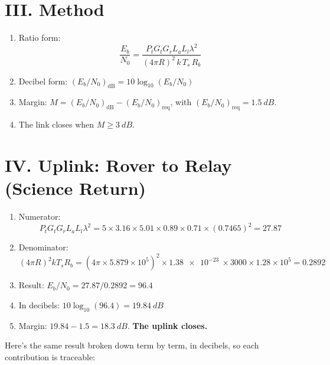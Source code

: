 \documentclass[11pt]{article}
\begin{document}
\section*{III. Method}

\begin{enumerate}[label=\alph*., leftmargin=*]
    \item Ratio form:
    \[
        \frac{E_b}{N_0} = \frac{P_t G_t G_r L_a L_l \lambda^2}{(4\pi R)^2\, k\, T_s\, R_b}
    \]
    \item Decibel form: $\left(E_b/N_0\right)_{\mathrm{dB}} = 10\log_{10}\left(E_b/N_0\right)$
    \item Margin: $M = \left(E_b/N_0\right)_{\mathrm{dB}} - \left(E_b/N_0\right)_{\mathrm{req}}$,
    with $\left(E_b/N_0\right)_{\mathrm{req}} = \SI{1.5}{dB}$.
    \item The link closes when $M \geq \SI{3}{dB}$.
\end{enumerate}

\section*{IV. Uplink: Rover to Relay (Science Return)}

\begin{enumerate}[label=\alph*., leftmargin=*]
    \item Numerator:
    \[
        P_t G_t G_r L_a L_l \lambda^2
        = 5 \times 3.16 \times 5.01 \times 0.89 \times 0.71 \times (0.7465)^2
        = 27.87
    \]
    \item Denominator:
    \[
        (4\pi R)^2 k T_s R_b
        = \left(4\pi \times 5.879\!\times\!10^5\right)^2 \times \SI{1.38e-23}{} \times 3000
          \times 1.28\!\times\!10^5
        = 0.2892
    \]
    \item Result: $E_b/N_0 = 27.87 / 0.2892 = 96.4$
    \item In decibels: $10\log_{10}(96.4) = \SI{19.84}{dB}$
    \item Margin: $19.84 - 1.5 = \SI{18.3}{dB}$. \textbf{The uplink closes.}
\end{enumerate}

\noindent Here's the same result broken down term by term, in decibels, so each contribution is
traceable:
\end{document}
